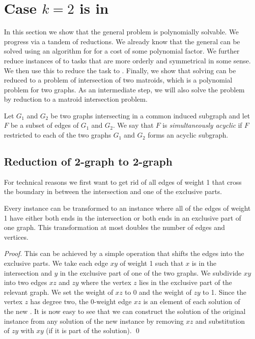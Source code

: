\section{Case $k = 2$ is in \PP}

In this section we show that the general \SMST problem is polynomially solvable. We progress via a tandem of reductions. We already know that the general \SMST can be solved using an algorithm for \OISMST for a cost of some polynomial factor. We further reduce instances of \OISMST to tasks that are more orderly and symmetrical in some sense. We then use this to reduce the task to \POISMST. Finally, we show that solving \POISMST can be reduced to a problem of intersection of two matroids, which is a polynomial problem for two graphs. As an intermediate step, we will also solve the \SST problem by reduction to a matroid intersection problem. 

\begin{definition}
Let $G_1$ and $G_2$ be two graphs intersecting in a common induced subgraph and let $F$ be a subset of edges of $G_1$ and $G_2$. We say that $F$ is {\em simultaneously acyclic} if $F$ restricted to each of the two graphs $G_1$ and $G_2$ forms an acyclic subgraph. 
\end{definition}

\subsection{Reduction of 2-graph \OISMST to 2-graph \POISMST}\label{sec:reductioncap01smst}

For technical reasons we first want to get rid of all edges of weight 1 that cross the boundary in between the intersection and one of the exclusive parts. 

\begin{observation}\label{obs:OInotransedges}
Every \OISMST instance can be transformed to an instance where all of the edges of weight 1 have either both ends in the intersection or both ends in an exclusive part of one graph. This transformation at most doubles the number of edges and vertices. 
\end{observation}
\begin{proof}
This can be achieved by a simple operation that shifts the edges into the exclusive parts. We take each edge $xy$ of weight 1 such that $x$ is in the intersection and $y$ in the exclusive part of one of the two graphs. We subdivide $xy$ into two edges $xz$ and $zy$ where the vertex $z$ lies in the exclusive part of the relevant graph. We set the weight of $xz$ to 0 and the weight of $zy$ to 1. Since the vertex $z$ has degree two, the 0-weight edge $xz$ is an element of each solution of the new \OISMST. It is now easy to see that we can construct the solution of the original \OISMST instance from any solution of the new instance by removing $xz$ and substitution of $zy$ with $xy$ (if it is part of the solution). \qed
\end{proof}


